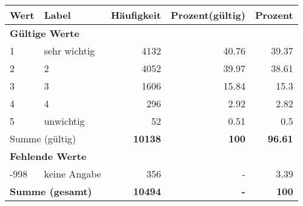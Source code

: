      \begin{longtable}{lXrrr}
     \toprule
     \textbf{Wert} & \textbf{Label} & \textbf{Häufigkeit} & \textbf{Prozent(gültig)} & \textbf{Prozent} \\
     \endhead
     \midrule
     \multicolumn{5}{l}{\textbf{Gültige Werte}}\\

     1 &
     \multicolumn{1}{X}{ sehr wichtig   } &


       \num{4132} &
       \num[round-mode=places,round-precision=2]{40,76} &
         \num[round-mode=places,round-precision=2]{39,37} \\

     2 &
     \multicolumn{1}{X}{ 2   } &


       \num{4052} &
       \num[round-mode=places,round-precision=2]{39,97} &
         \num[round-mode=places,round-precision=2]{38,61} \\

     3 &
     \multicolumn{1}{X}{ 3   } &


       \num{1606} &
       \num[round-mode=places,round-precision=2]{15,84} &
         \num[round-mode=places,round-precision=2]{15,3} \\

     4 &
     \multicolumn{1}{X}{ 4   } &


       \num{296} &
       \num[round-mode=places,round-precision=2]{2,92} &
         \num[round-mode=places,round-precision=2]{2,82} \\

     5 &
     \multicolumn{1}{X}{ unwichtig   } &


       \num{52} &
       \num[round-mode=places,round-precision=2]{0,51} &
         \num[round-mode=places,round-precision=2]{0,5} \\
     \midrule
     \multicolumn{2}{l}{Summe (gültig)} &
       \textbf{\num{10138}} &
     \textbf{100} &
       \textbf{\num[round-mode=places,round-precision=2]{96,61}} \\
     \multicolumn{5}{l}{\textbf{Fehlende Werte}}\\
       -998 &
       keine Angabe &
         \num{356} &
        - &
         \num[round-mode=places,round-precision=2]{3,39} \\
     \midrule
     \multicolumn{2}{l}{\textbf{Summe (gesamt)}} &
          \textbf{\num{10494}} &
        \textbf{-} &
        \textbf{100} \\
     \bottomrule
     \end{longtable}
     
